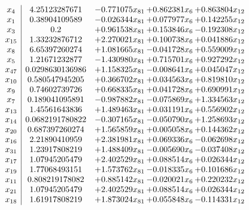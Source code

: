 \documentclass[11pt]{article}
\begin{document}
\[\begin{array}{c| c c@{\hskip 2pt} c@{\hskip 2pt} c@{\hskip 2pt} }
 x_{4}   &  4.25123287671 & -0.771075 x_{81} & + 0.862381 x_{6} & + 0.863804 x_{12}\\
 x_{1}   &  0.38904109589 & -0.026344 x_{81} & + 0.077977 x_{6} & + 0.142255 x_{12}\\
 x_{3}   &  0.2 & + 0.961538 x_{81} & + 0.153846 x_{6} & -0.192308 x_{12}\\
 x_{15}   &  1.33232876712 & + 2.270021 x_{81} & + 0.100738 x_{6} & + 0.041886 x_{12}\\
 x_{8}   &  6.65397260274 & + 1.081665 x_{81} & -0.041728 x_{6} & + 0.559009 x_{12}\\
 x_{5}   &  1.21671232877 & -1.430980 x_{81} & + 0.715701 x_{6} & + 0.927292 x_{12}\\
 x_{47}   &  0.0298630136986 & + 1.158325 x_{81} & -0.008641 x_{6} & + 0.045047 x_{12}\\
 x_{10}   &  0.580547945205 & + 0.366702 x_{81} & + 0.034563 x_{6} & + 0.819810 x_{12}\\
 x_{9}   &  0.74602739726 & + 0.668335 x_{81} & + 0.041728 x_{6} & + 0.690991 x_{12}\\
 x_{7}   &  0.189041095891 & -0.987882 x_{81} & -0.075869 x_{6} & + 1.334563 x_{12}\\
 x_{13}   &  1.45561643836 & + 1.489463 x_{81} & + 0.031191 x_{6} & + 0.556902 x_{12}\\
 x_{14}   &  0.0682191780822 & -0.307165 x_{81} & -0.050790 x_{6} & + 1.258693 x_{12}\\
 x_{20}   &  0.687397260274 & + 1.565859 x_{81} & + 0.005058 x_{6} & + 0.144362 x_{12}\\
 x_{16}   &  2.21890410959 & + 2.381981 x_{81} & + 0.069336 x_{6} & -0.062698 x_{12}\\
 x_{31}   &  1.23917808219 & + 1.488409 x_{81} & -0.005690 x_{6} & -0.037408 x_{12}\\
 x_{17}   &  1.07945205479 & + 2.402529 x_{81} & + 0.088514 x_{6} & + 0.026344 x_{12}\\
 x_{19}   &  1.77068493151 & + 1.573762 x_{81} & -0.018335 x_{6} & + 0.101686 x_{12}\\
 x_{11}   &  0.808219178082 & + 0.885142 x_{81} & -0.020021 x_{6} & + 0.220232 x_{12}\\
 x_{21}   &  1.07945205479 & + 2.402529 x_{81} & + 0.088514 x_{6} & + 0.026344 x_{12}\\
 x_{18}   &  1.61917808219 & + 1.873024 x_{81} & + 0.055848 x_{6} & -0.114331 x_{12}\\

\end{array}\]
\end{document}

